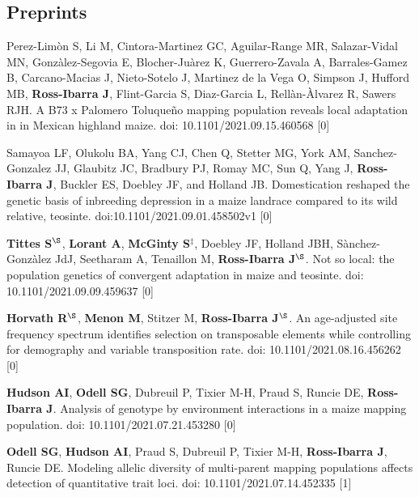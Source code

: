 \documentclass[letterpaper,10pt]{article}
\renewenvironment{itemize}{
  \begin{list}{}{
    \setlength{\leftmargin}{1.5em}
  }
}{
  \end{list}
}
\begin{document}
\subsection*{Preprints}
\begin{itemize}

\item Perez-Lim\`{o}n S, Li M, Cintora-Martinez GC, Aguilar-Range MR, Salazar-Vidal MN, Gonz\`{a}lez-Segovia E, Blocher-Ju\`{a}rez K, Guerrero-Zavala A, Barrales-Gamez B, Carcano-Macias J,  Nieto-Sotelo J, Martinez de la Vega O, Simpson J, Hufford MB, \textbf{Ross-Ibarra J}, Flint-Garcia S, Diaz-Garcia L, Rell\`{a}n-\`{A}lvarez R, Sawers RJH. A B73 x Palomero Toluqueño mapping population reveals local adaptation in in Mexican highland maize. doi: 10.1101/2021.09.15.460568
 [0]\\

\item  Samayoa LF, Olukolu  BA, Yang CJ, Chen Q, Stetter MG, York AM, Sanchez-Gonzalez JJ,  Glaubitz JC, Bradbury PJ,  Romay MC, Sun Q, Yang J, \textbf{Ross-Ibarra J}, Buckler ES, Doebley JF, and Holland JB.   Domestication reshaped the genetic basis of inbreeding depression in a maize landrace compared to its wild relative, teosinte. doi:10.1101/2021.09.01.458502v1
 [0]\\

\item \textbf{Tittes S}$^\S$, \textbf{Lorant A}, \textbf{McGinty S}$^\ddagger$, Doebley JF,  Holland JBH, S\`{a}nchez-Gonz\`{a}lez JdJ, Seetharam A, Tenaillon M, \textbf{Ross-Ibarra J}$^\S$. Not so local: the population genetics of convergent adaptation in maize and teosinte. doi: 10.1101/2021.09.09.459637
 [0]\\

\item \textbf{Horvath R}$^\S$, \textbf{Menon M}, Stitzer M, \textbf{Ross-Ibarra J}$^\S$. An age-adjusted site frequency spectrum identifies selection on transposable elements while controlling for demography and variable transposition rate. doi: 10.1101/2021.08.16.456262
 [0]\\

\item \textbf{Hudson AI}, \textbf{Odell SG}, Dubreuil P, Tixier M-H, Praud S, Runcie DE, \textbf{Ross-Ibarra J}. Analysis of genotype by environment interactions in a maize mapping population. doi: 10.1101/2021.07.21.453280
 [0]\\

\item \textbf{Odell SG}, \textbf{Hudson AI}, Praud S, Dubreuil P, Tixier M-H, \textbf{Ross-Ibarra J}, Runcie DE. Modeling allelic diversity of multi-parent mapping populations affects detection of quantitative trait loci. doi: 10.1101/2021.07.14.452335
 [1]\\


\end{itemize}
\end{document}
